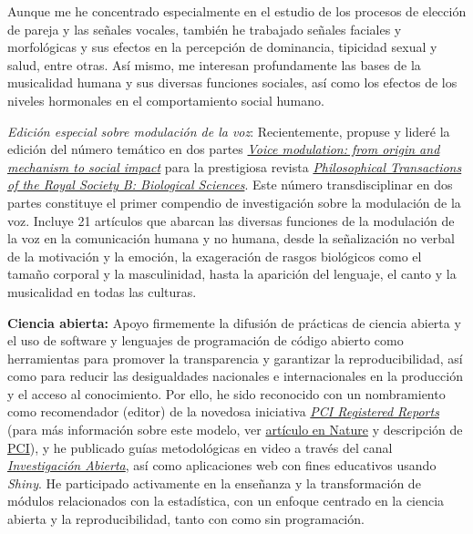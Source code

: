 \documentclass[11pt,a4paper,]{awesome-cv}
\begin{document}
\begin{footnotesize}
Aunque me he concentrado especialmente en el estudio de los procesos de elección de pareja y las señales vocales, también he trabajado señales faciales y morfológicas y sus efectos en la percepción de dominancia, tipicidad sexual y salud, entre otras. Así mismo, me interesan profundamente las bases de la musicalidad humana y sus diversas funciones sociales, así como los efectos de los niveles hormonales en el comportamiento social humano.

\textit{Edición especial sobre modulación de la voz}: Recientemente, propuse y lideré la edición del número temático en dos partes \href{https://royalsocietypublishing.org/toc/rstb/2021/376/1840}{\textit{Voice modulation: from origin and mechanism to social impact}} para la prestigiosa revista \href{https://royalsocietypublishing.org/journal/rstb}{\textit{Philosophical Transactions of the Royal Society B: Biological Sciences}}. Este número transdisciplinar en dos partes constituye el primer compendio de investigación sobre la modulación de la voz. Incluye 21 artículos que abarcan las diversas funciones de la modulación de la voz en la comunicación humana y no humana, desde la señalización no verbal de la motivación y la emoción, la exageración de rasgos biológicos como el tamaño corporal y la masculinidad, hasta la aparición del lenguaje, el canto y la musicalidad en todas las culturas.

\textbf{Ciencia abierta:} Apoyo firmemente la difusión de prácticas de ciencia abierta y el uso de software y lenguajes de programación de código abierto como herramientas para promover la transparencia y garantizar la reproducibilidad, así como para reducir las desigualdades nacionales e internacionales en la producción y el acceso al conocimiento. Por ello, he sido reconocido con un nombramiento como recomendador (editor) de la novedosa iniciativa \href{https://rr.peercommunityin.org/}{\textit{PCI Registered Reports}} (para más información sobre este modelo, ver \href{https://www.nature.com/articles/d41586-023-03342-6}{artículo en Nature} y descripción de \href{https://rr.peercommunityin.org/about/about}{PCI}), y he publicado guías metodológicas en video a través del canal \href{https://www.youtube.com/@InvestigacionAbierta}{\textit{Investigación Abierta}}, así como aplicaciones web con fines educativos usando \textit{Shiny}. He participado activamente en la enseñanza y la transformación de módulos relacionados con la estadística, con un enfoque centrado en la ciencia abierta y la reproducibilidad, tanto con como sin programación.


\end{footnotesize}
\end{document}

